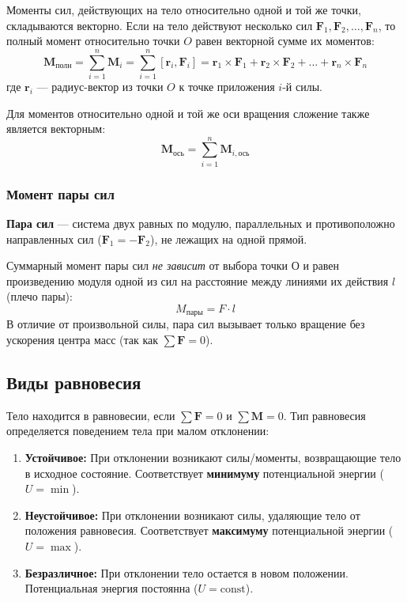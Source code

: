 Моменты сил, действующих на тело относительно одной и той же точки, складываются векторно. Если на тело действуют несколько сил $\mathbf{F}_1, \mathbf{F}_2, \dots, \mathbf{F}_n$, то полный момент относительно точки $O$ равен векторной сумме их моментов:
\[
\mathbf{M}_{\text{полн}} = \sum_{i=1}^n \mathbf{M}_i = \sum_{i=1}^n [\mathbf{r}_i, \mathbf{F}_i] = \mathbf{r}_1 \times \mathbf{F}_1 + \mathbf{r}_2 \times \mathbf{F}_2 + \dots + \mathbf{r}_n \times \mathbf{F}_n
\]
где $\mathbf{r}_i$ --- радиус-вектор из точки $O$ к точке приложения $i$-й силы.

Для моментов относительно одной и той же оси вращения сложение также является векторным:
\[
\mathbf{M}_{\text{ось}} = \sum_{i=1}^n \mathbf{M}_{i,\text{ось}}
\]

\subsubsection{Момент пары сил}
\textbf{Пара сил} --- система двух равных по модулю, параллельных и противоположно направленных сил ($\mathbf{F}_1 = -\mathbf{F}_2$), не лежащих на одной прямой.

Суммарный момент пары сил \textit{не зависит} от выбора точки О и равен произведению модуля одной из сил на расстояние между линиями их действия $l$ (плечо пары):
\[
M_{пары} = F \cdot l
\]
В отличие от произвольной силы, пара сил вызывает только вращение без ускорения центра масс (так как $\sum \mathbf{F} = 0$).

\subsection{Виды равновесия}
Тело находится в равновесии, если $\sum \mathbf{F} = 0$ и $\sum \mathbf{M} = 0$. Тип равновесия определяется поведением тела при малом отклонении:

\begin{enumerate}
    \item \textbf{Устойчивое:} При отклонении возникают силы/моменты, возвращающие тело в исходное состояние. Соответствует \textbf{минимуму} потенциальной энергии ($U = \min$).
    \item \textbf{Неустойчивое:} При отклонении возникают силы, удаляющие тело от положения равновесия. Соответствует \textbf{максимуму} потенциальной энергии ($U = \max$).
    \item \textbf{Безразличное:} При отклонении тело остается в новом положении. Потенциальная энергия постоянна ($U = \text{const}$).
\end{enumerate}

